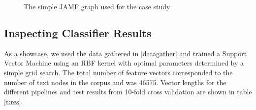 \begin{figure}[h]
\centering
{}
\label{f:jamfgraph}
\caption{The simple JAMF graph used for the case study}
\end{figure}

\subsection{Inspecting Classifier Results}

As a showcase, we used the data gathered in \ref{datagather} and trained a Support Vector Machine \cite{libsvm} using an RBF kernel with optimal parameters determined by a simple grid search.
The total number of feature vectors corresponded to the number of text nodes in the corpus and was 46575.
Vector lengths for the different pipelines and test results from 10-fold cross validation are shown in table \ref{t:res}.

